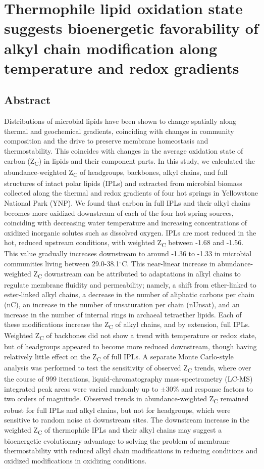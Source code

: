 \chapter{Thermophile lipid oxidation state suggests bioenergetic favorability of alkyl chain modification along temperature and redox gradients}\label{ch1}

\section{Abstract}
Distributions of microbial lipids have been shown to change spatially along thermal and geochemical gradients, coinciding with changes in community composition and the drive to preserve membrane homeostasis and thermostability. This coincides with changes in the average oxidation state of carbon (Z\textsubscript{C}) in lipids and their component parts. In this study, we calculated the abundance-weighted Z\textsubscript{C} of headgroups, backbones, alkyl chains, and full structures of intact polar lipids (IPLs) and extracted from microbial biomass collected along the thermal and redox gradients of four hot springs in Yellowstone National Park (YNP). We found that carbon in full IPLs and their alkyl chains becomes more oxidized downstream of each of the four hot spring sources, coinciding with decreasing water temperature and increasing concentrations of oxidized inorganic solutes such as dissolved oxygen. IPLs are most reduced in the hot, reduced upstream conditions, with weighted Z\textsubscript{C} between -1.68 and -1.56. This value gradually increases downstream to around -1.36 to -1.33 in microbial communities living between 29.0-38.1$^\circ$C. This near-linear increase in abundance-weighted Z\textsubscript{C} downstream can be attributed to adaptations in alkyl chains to regulate membrane fluidity and permeability; namely, a shift from ether-linked to ester-linked alkyl chains, a decrease in the number of aliphatic carbons per chain (nC), an increase in the number of unsaturation per chain (nUnsat), and an increase in the number of internal rings in archaeal tetraether lipids. Each of these modifications increase the Z\textsubscript{C} of alkyl chains, and by extension, full IPLs. Weighted Z\textsubscript{C} of backbones did not show a trend with temperature or redox state, but of headgroups appeared to become more reduced downstream, though having relatively little effect on the Z\textsubscript{C} of full IPLs. A separate Monte Carlo-style analysis was performed to test the sensitivity of observed Z\textsubscript{C} trends, where over the course of 999 iterations, liquid-chromatography mass-spectrometry (LC-MS) integrated peak areas were varied randomly up to $\pm$30\% and response factors to two orders of magnitude. Observed trends in abundance-weighted Z\textsubscript{C} remained robust for full IPLs and alkyl chains, but not for headgroups, which were sensitive to random noise at downstream sites. The downstream increase in the weighted Z\textsubscript{C} of thermophile IPLs and their alkyl chains may suggest a bioenergetic evolutionary advantage to solving the problem of membrane thermostability with reduced alkyl chain modifications in reducing conditions and oxidized modifications in oxidizing conditions.

